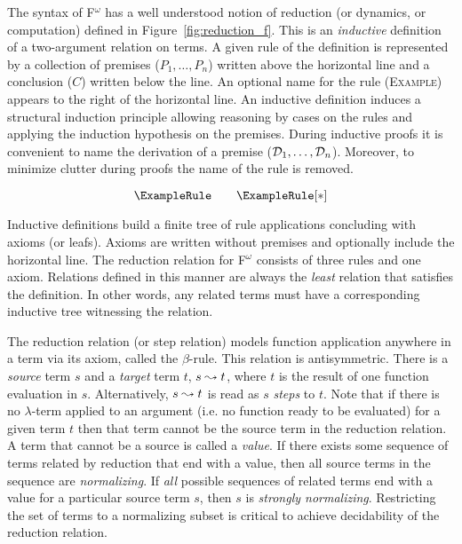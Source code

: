 

The syntax of F$^\omega$ has a well understood notion of reduction (or dynamics, or computation) defined in Figure~\ref{fig:reduction_f}.
This is an \textit{inductive} definition of a two-argument relation on terms.
A given rule of the definition is represented by a collection of premises ($P_1, \ldots, P_n$) written above the horizontal line and a conclusion ($C$) written below the line.
An optional name for the rule (\textsc{Example}) appears to the right of the horizontal line.
An inductive definition induces a structural induction principle allowing reasoning by cases on the rules and applying the induction hypothesis on the premises.
During inductive proofs it is convenient to name the derivation of a premise ($\mathcal{D}_{1}, \ldots, \mathcal{D}_{n}$).
Moreover, to minimize clutter during proofs the name of the rule is removed.

$$\ExampleRule \quad\quad \ExampleRule[*]$$

Inductive definitions build a finite tree of rule applications concluding with axioms (or leafs).
Axioms are written without premises and optionally include the horizontal line.
The reduction relation for F$^\omega$ consists of three rules and one axiom.
Relations defined in this manner are always the \textit{least} relation that satisfies the definition.
In other words, any related terms must have a corresponding inductive tree witnessing the relation.

The reduction relation (or step relation) models function application anywhere in a term via its axiom, called the $\beta$-rule.
This relation is antisymmetric.
There is a \textit{source} term $s$ and a \textit{target} term $t$, $s \leadsto t$, where $t$ is the result of one function evaluation in $s$.
Alternatively, $s \leadsto t$ is read as $s$ \textit{steps} to $t$.
Note that if there is no $\lambda$-term applied to an argument (i.e. no function ready to be evaluated) for a given term $t$ then that term cannot be the source term in the reduction relation.
A term that cannot be a source is called a \textit{value}.
If there exists some sequence of terms related by reduction that end with a value, then all source terms in the sequence are \textit{normalizing}.
If \textit{all} possible sequences of related terms end with a value for a particular source term $s$, then $s$ is \textit{strongly normalizing}.
Restricting the set of terms to a normalizing subset is critical to achieve decidability of the reduction relation.

